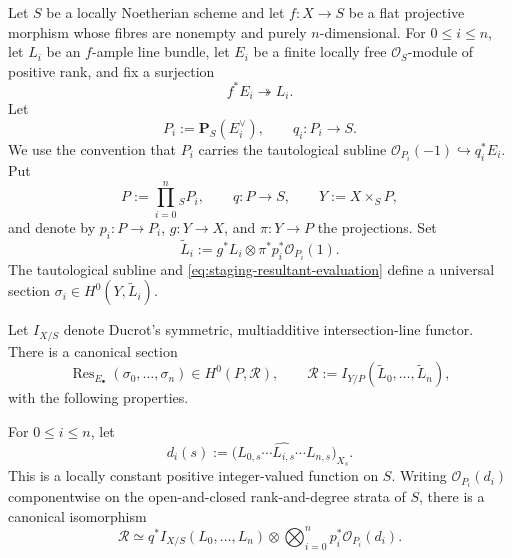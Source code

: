 \begin{theorem}\label{thm:staging-basepoint-free-relative-resultant}
Let \(S\) be a locally Noetherian scheme and let
\(f\colon X\to S\) be a flat projective morphism whose fibres are nonempty
and purely \(n\)-dimensional.  For \(0\leq i\leq n\), let \(L_i\) be an
\(f\)-ample line bundle, let \(E_i\) be a finite locally free
\(\mathcal O_S\)-module of positive rank, and fix a surjection
\begin{equation}\label{eq:staging-resultant-evaluation}
 f^*E_i\twoheadrightarrow L_i.
\end{equation}
Let
\[
 P_i:=\mathbf P_S(E_i^\vee),
 \qquad q_i\colon P_i\to S.
\]
We use the convention that \(P_i\) carries the tautological subline
\(\mathcal O_{P_i}(-1)\hookrightarrow q_i^*E_i\).  Put
\[
 P:=\prod_{i=0}^n{}_S P_i,
 \qquad q\colon P\to S,
 \qquad Y:=X\times_S P,
\]
and denote by \(p_i\colon P\to P_i\), \(g\colon Y\to X\), and
\(\pi\colon Y\to P\) the projections.  Set
\begin{equation}\label{eq:staging-resultant-universal-line}
 \widetilde L_i
 :=g^*L_i\otimes\pi^*p_i^*\mathcal O_{P_i}(1).
\end{equation}
The tautological subline and \eqref{eq:staging-resultant-evaluation}
define a universal section
\(\sigma_i\in H^0(Y,\widetilde L_i)\).

Let \(I_{X/S}\) denote Ducrot's symmetric, multiadditive intersection-line
functor.  There is a canonical section
\begin{equation}\label{eq:staging-resultant-section}
 \operatorname{Res}_{E_\bullet}(\sigma_0,\ldots,\sigma_n)
 \in H^0(P,\mathscr R),
 \qquad
 \mathscr R:=I_{Y/P}(\widetilde L_0,\ldots,\widetilde L_n),
\end{equation}
with the following properties.

For \(0\leq i\leq n\), let
\begin{equation}\label{eq:staging-resultant-mixed-degree}
 d_i(s):=
 \bigl(L_{0,s}\cdots\widehat{L_{i,s}}\cdots L_{n,s}\bigr)_{X_s}.
\end{equation}
This is a locally constant positive integer-valued function on \(S\).
Writing \(\mathcal O_{P_i}(d_i)\) componentwise on the open-and-closed
rank-and-degree strata of \(S\), there is a canonical isomorphism
\begin{equation}\label{eq:staging-resultant-line-formula}
 \mathscr R\simeq
 q^*I_{X/S}(L_0,\ldots,L_n)
 \otimes
 \bigotimes_{i=0}^n p_i^*\mathcal O_{P_i}(d_i).
\end{equation}


\end{theorem}
